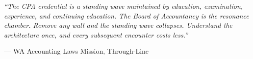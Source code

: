 \documentclass[11pt,letterpaper]{article}
\begin{document}
\vspace{1cm}

\begin{quotebox}
\textit{``The CPA credential is a standing wave maintained by education, examination, experience, and continuing education. The Board of Accountancy is the resonance chamber. Remove any wall and the standing wave collapses. Understand the architecture once, and every subsequent encounter costs less.''}

\vspace{0.5em}
\hfill --- WA Accounting Laws Mission, Through-Line
\end{quotebox}
\end{document}
